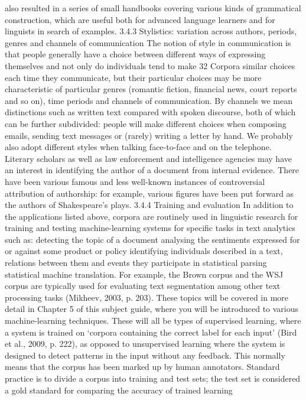 also resulted in a series of small handbooks covering various kinds of grammatical
construction, which are useful both for advanced language learners and for linguists
in search of examples.
3.4.3 Stylistics: variation across authors, periods, genres and channels of
communication
The notion of style in communication is that people generally have a choice between
different ways of expressing themselves and not only do individuals tend to make
32
Corpora
similar choices each time they communicate, but their particular choices may be
more characteristic of particular genres (romantic fiction, financial news, court
reports and so on), time periods and channels of communication. By channels we
mean distinctions such as written text compared with spoken discourse, both of
which can be further subdivided: people will make different choices when
composing emails, sending text messages or (rarely) writing a letter by hand. We
probably also adopt different styles when talking face-to-face and on the telephone.
Literary scholars as well as law enforcement and intelligence agencies may have an
interest in identifying the author of a document from internal evidence. There have
been various famous and less well-known instances of controversial attribution of
authorship: for example, various figures have been put forward as the authors of
Shakespeare’s plays.
3.4.4 Training and evaluation
In addition to the applications listed above, corpora are routinely used in linguistic
research for training and testing machine-learning systems for specific tasks in text
analytics such as:
detecting the topic of a document
analysing the sentiments expressed for or against some product or policy
identifying individuals described in a text, relations between them and events
they participate in
statistical parsing
statistical machine translation.
For example, the Brown corpus and the WSJ corpus are typically used for evaluating
text segmentation among other text processing tasks (Mikheev, 2003, p. 203).
These topics will be covered in more detail in Chapter 5 of this subject guide, where
you will be introduced to various machine-learning techniques. These will all be
types of supervised learning, where a system is trained on ‘corpora containing the
correct label for each input’ (Bird et al., 2009, p. 222), as opposed to unsupervised
learning where the system is designed to detect patterns in the input without any
feedback. This normally means that the corpus has been marked up by human
annotators. Standard practice is to divide a corpus into training and test sets; the
test set is considered a gold standard for comparing the accuracy of trained learning
